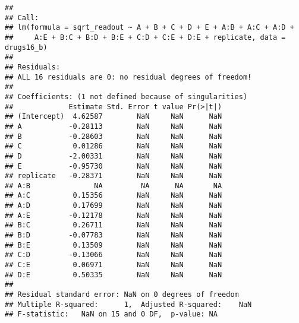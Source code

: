 \documentclass[
]{article}
\begin{document}
\begin{verbatim}
## 
## Call:
## lm(formula = sqrt_readout ~ A + B + C + D + E + A:B + A:C + A:D + 
##     A:E + B:C + B:D + B:E + C:D + C:E + D:E + replicate, data = drugs16_b)
## 
## Residuals:
## ALL 16 residuals are 0: no residual degrees of freedom!
## 
## Coefficients: (1 not defined because of singularities)
##             Estimate Std. Error t value Pr(>|t|)
## (Intercept)  4.62587        NaN     NaN      NaN
## A           -0.28113        NaN     NaN      NaN
## B           -0.28603        NaN     NaN      NaN
## C            0.01286        NaN     NaN      NaN
## D           -2.00331        NaN     NaN      NaN
## E           -0.95730        NaN     NaN      NaN
## replicate   -0.28371        NaN     NaN      NaN
## A:B               NA         NA      NA       NA
## A:C          0.15356        NaN     NaN      NaN
## A:D          0.17699        NaN     NaN      NaN
## A:E         -0.12178        NaN     NaN      NaN
## B:C          0.26711        NaN     NaN      NaN
## B:D         -0.07783        NaN     NaN      NaN
## B:E          0.13509        NaN     NaN      NaN
## C:D         -0.13066        NaN     NaN      NaN
## C:E          0.06971        NaN     NaN      NaN
## D:E          0.50335        NaN     NaN      NaN
## 
## Residual standard error: NaN on 0 degrees of freedom
## Multiple R-squared:      1,  Adjusted R-squared:    NaN 
## F-statistic:   NaN on 15 and 0 DF,  p-value: NA
\end{verbatim}
\end{document}
